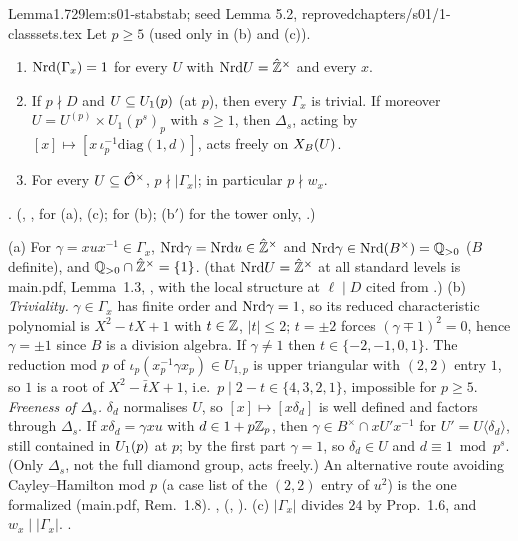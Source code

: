 \begin{quoted}{Lemma}{1.7}{29}{lem:s01-stab}{stab; seed Lemma 5.2, reproved}{chapters/s01/1-classsets.tex}\label{rpt:lem:s01-stab}
Let $p\ge5$ (used only in (b) and (c)).
\begin{enumerate}[label=(\alph*)]
\item $\mathrm{Nrd}(\Gamma_x)=1$ for every $U$ with $\mathrm{Nrd} U=\hat{\mathbb{Z}}^\times$ and every $x$.
\item If $p\nmid D$ and $U\subseteq U_1(p)$ (at $p$), then every $\Gamma_x$ is trivial. If moreover $U=U^{(p)}\times U_{1}(p^s)_p$ with $s\ge1$,
  then $\Delta_s$, acting by $[x]\mapsto[x\,\iota_p^{-1}\mathrm{diag}(1,d)]$, acts freely on $X_B(U)$.
\item For every $U\subseteq\hat{\mathcal{O}}^\times$, $p\nmid|\Gamma_x|$; in particular $p\nmid w_x$.
\end{enumerate}
\stproved. \stformal{} (, ,
 for (a), (c);  for (b); (b$'$) for the tower only,
.)
\end{quoted}
\begin{outline}
(a) For $\gamma=xux^{-1}\in\Gamma_x$, $\mathrm{Nrd}\gamma=\mathrm{Nrd} u\in\hat{\mathbb{Z}}^\times$ and $\mathrm{Nrd}\gamma\in\mathrm{Nrd}(B^\times)=\mathbb{Q}_{>0}$ ($B$ definite), and
$\mathbb{Q}_{>0}\cap\hat{\mathbb{Z}}^\times=\{1\}$. \stproved{} (that $\mathrm{Nrd} U=\hat{\mathbb{Z}}^\times$ at all standard levels is main.pdf, Lemma~1.3, \stproved{},
with the local structure at $\ell\mid D$ cited from \cite[Thm.~13.3.11]{Vo}.)
(b) \emph{Triviality.} $\gamma\in\Gamma_x$ has finite order and $\mathrm{Nrd}\gamma=1$, so its reduced characteristic polynomial is $X^2-tX+1$ with
$t\in\mathbb{Z}$, $|t|\le2$; $t=\pm2$ forces $(\gamma\mp1)^2=0$, hence $\gamma=\pm1$ since $B$ is a division algebra. If $\gamma\ne1$ then
$t\in\{-2,-1,0,1\}$. The reduction mod $p$ of $\iota_p(x_p^{-1}\gamma x_p)\in U_{1,p}$ is upper triangular with $(2,2)$ entry $1$, so $1$ is a root of
$X^2-\bar tX+1$, i.e.\ $p\mid2-t\in\{4,3,2,1\}$, impossible for $p\ge5$.
\emph{Freeness of $\Delta_s$.} $\delta_d$ normalises $U$, so $[x]\mapsto[x\delta_d]$ is well defined and factors through $\Delta_s$. If
$x\delta_d=\gamma xu$ with $d\in1+p\mathbb{Z}_p$, then $\gamma\in B^\times\cap xU'x^{-1}$ for $U'=U\langle\delta_d\rangle$, still contained in $U_1(p)$ at $p$;
by the first part $\gamma=1$, so $\delta_d\in U$ and $d\equiv1\bmod p^s$. (Only $\Delta_s$, not the full diamond group, acts freely.)
An alternative route avoiding Cayley--Hamilton mod $p$ (a case list of the $(2,2)$ entry of $u^2$) is the one formalized
(main.pdf, Rem.~1.8). \stproved{}, \stformal{} (, ).
(c) $|\Gamma_x|$ divides $24$ by Prop.~1.6, and $w_x\mid|\Gamma_x|$. \stproved.
\end{outline}


